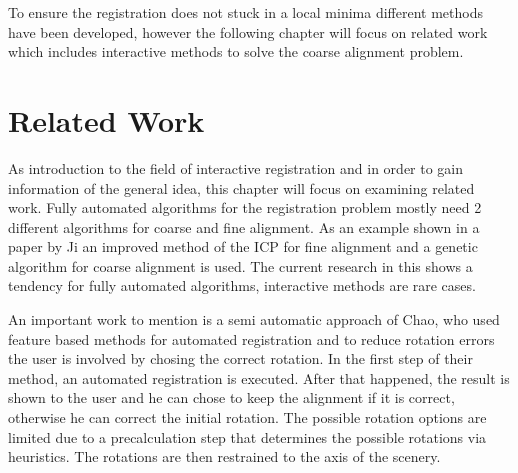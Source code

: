 \documentclass[hyperref,english,bachelorofscience,bibnum]{cgvpub}
\begin{document}
To ensure the registration does not stuck in a local minima different methods have been developed, however the following chapter will focus on related work which includes interactive methods to solve the coarse alignment problem.



\section{Related Work}

As introduction to the field of interactive registration and in order to gain information of the general idea, this chapter will focus on examining related work. Fully automated algorithms for the registration problem mostly need 2 different algorithms for coarse and fine alignment. As an example shown in a paper by Ji \cite{Ji2017} an improved method of the ICP for fine alignment and a genetic algorithm for coarse alignment is used. The current research in this shows a tendency for fully automated algorithms, interactive methods are rare cases.

An important work to mention is a semi automatic approach of Chao, who used feature based methods for automated registration and to reduce rotation errors the user is involved by chosing the correct rotation.\cite{Chao}
In the first step of their method, an automated registration is executed. After that happened, the result is shown to the user and he can chose to keep the alignment if it is correct, otherwise he can correct the initial rotation. The possible rotation options are limited due to a precalculation step that determines the possible rotations via heuristics. The rotations are then restrained to the axis of the scenery.\cite{Chao}
\end{document}
